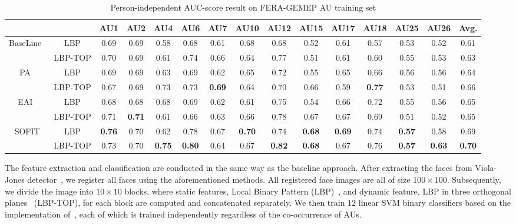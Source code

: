 \documentclass[review]{elsarticle}
\begin{document}
\begin{table}
	\caption{Person-independent AUC-score result on FERA-GEMEP AU training set}
	\begin{center}
		\label{table:fera}
		\begin{tabular}{ccccccccccccccc}
			\toprule
			& & AU1 & AU2 & AU4 & AU6 & AU7 & AU10 & AU12 & AU15 & AU17 & AU18 & AU25 & AU26 & Avg.	\\ 
			\midrule
			\multirow{2}{*}{BaseLine~\cite{Valstar_FERA11}}	& LBP 		&0.69	&0.69	&0.58	&0.68	&0.61	&0.68	&0.68	&0.52	&0.61	&0.57	&0.53	&0.52	&0.61 \\
			& LBP-TOP &0.70	&0.69	&0.61	&0.74	&0.66	&0.64	&0.77	&0.51	&0.61	&0.60	&0.55	&0.53	&0.63 \\
			\midrule
			\multirow{2}{*}{PA~\cite{Tadas_ECCV14}}					& LBP 		&0.69	&0.69	&0.63	&0.69	&0.62	&0.65	&0.72	&0.55	&0.65	&0.66	&0.56	&0.56	&0.64 \\
			& LBP-TOP &0.67	&0.69	&0.73	&0.73	&\textbf{0.69}\cellcolor[gray]{0.9}	&0.64	&0.70	&0.66	&0.59	&\textbf{0.77}\cellcolor[gray]{0.9}	&0.53	&0.51	&0.66 \\
			\midrule
			\multirow{2}{*}{EAI~\cite{Yang_SMCB12}}					& LBP 		&0.68	&0.68	&0.68	&0.69	&0.62	&0.61	&0.75	&0.54	&0.66	&0.72	&0.55	&0.56	&0.65 \\
			& LBP-TOP &0.71	&\textbf{0.71}\cellcolor[gray]{0.9}	&0.61	&0.66	&0.63	&0.66	&0.78	&0.67	&0.67	&0.69	&0.51	&0.52	&0.65 \\
			\midrule				
			\multirow{2}{*}{SOFIT}													& LBP 		&\textbf{0.76}\cellcolor[gray]{0.9}	&0.70	&0.62	&0.78	&0.67	&\textbf{0.70}\cellcolor[gray]{0.9}	&0.74	&\textbf{0.68}\cellcolor[gray]{0.9}	&\textbf{0.69}\cellcolor[gray]{0.9}	&0.74	&\textbf{0.57}\cellcolor[gray]{0.9}	&0.58	&0.69 \\
			& LBP-TOP &0.73	&0.70	&\textbf{0.75}\cellcolor[gray]{0.9}	&\textbf{0.80}\cellcolor[gray]{0.9}	&0.64	&0.67	&\textbf{0.82}\cellcolor[gray]{0.9}	&\textbf{0.68}\cellcolor[gray]{0.9}	&0.67	&0.76 &\textbf{0.57}\cellcolor[gray]{0.9}	&\textbf{0.63}\cellcolor[gray]{0.9}	&\textbf{0.70}\cellcolor[gray]{0.9} \\
			\bottomrule
		\end{tabular}
	\end{center}
\end{table}


The feature extraction and classification are conducted in the same way as the baseline approach. After extracting the faces from Viola-Jones detector~\cite{Viola_IJCV04}, we register all faces using the aforementioned methods. All registered face images are all of size $100\times100$. Subsequently, we divide the image into $10\times10$ blocks, where static features, Local Binary Pattern (LBP)~\cite{Ojala_PAMI02}, and dynamic feature, LBP in three orthogonal planes~\cite{Zhao_PAMI07} (LBP-TOP), for each block are computed and concatenated separately. We then train $12$ linear SVM binary classifiers based on the implementation of~\cite{SVMlib}, each of which is trained independently regardless of the co-occurrence of AUs.
\end{document}
